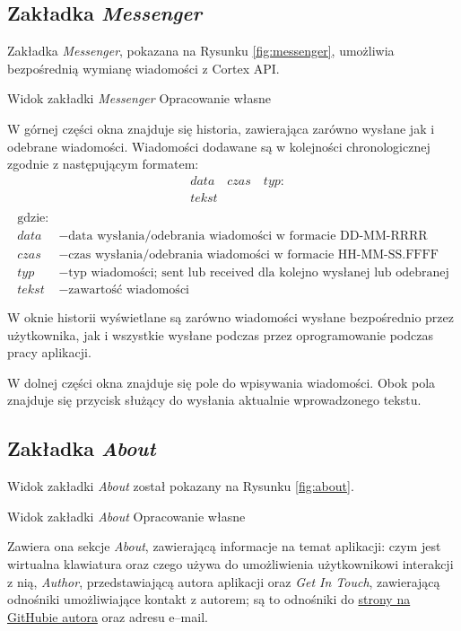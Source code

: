 \documentclass[skorowidz,skroty]{dyplomWEZUT}
\begin{document}
\subsection{Zakładka \textit{Messenger}}
Zakładka \textit{Messenger}, pokazana na Rysunku \vref{fig:messenger}, umożliwia bezpośrednią wymianę wiadomości z Cortex API.

{Widok zakładki \textit{Messenger}\label{fig:messenger}}
{Opracowanie własne}

W górnej części okna znajduje się historia, zawierająca zarówno wysłane jak i odebrane wiadomości. Wiadomości dodawane są w kolejności chronologicznej zgodnie z następującym formatem: 
\begin{align*}
    &data \quad czas \quad typ:\\
    &tekst\\
\end{align*}
\begin{align*}
    \text{gdzie:}\\
    data &- \text{data wysłania/odebrania wiadomości w formacie DD-MM-RRRR}\\
    czas &- \text{czas wysłania/odebrania wiadomości w formacie HH-MM-SS.FFFF}\\
    typ  &- \text{typ wiadomości; sent lub received dla kolejno wysłanej lub odebranej}\\
    tekst &- \text{zawartość wiadomości}
\end{align*}

W oknie historii wyświetlane są zarówno wiadomości wysłane bezpośrednio przez użytkownika, jak i wszystkie wysłane podczas przez oprogramowanie podczas pracy aplikacji.

W dolnej części okna znajduje się pole do wpisywania wiadomości. Obok pola znajduje się przycisk służący do wysłania aktualnie wprowadzonego tekstu.


\subsection{Zakładka \textit{About}}
Widok zakładki \textit{About} został pokazany na Rysunku \vref{fig:about}.

{Widok zakładki \textit{About}\label{fig:about}}
{Opracowanie własne}

Zawiera ona sekcje \textit{About}, zawierającą informacje na temat aplikacji: czym jest wirtualna klawiatura oraz czego używa do umożliwienia użytkownikowi interakcji z nią, \textit{Author}, przedstawiającą autora aplikacji oraz \textit{Get In Touch}, zawierającą odnośniki umożliwiające kontakt z autorem; są to odnośniki do \href{https://github.com/abaniuszewicz}{strony na GitHubie autora} oraz adresu e--mail.
\end{document}
